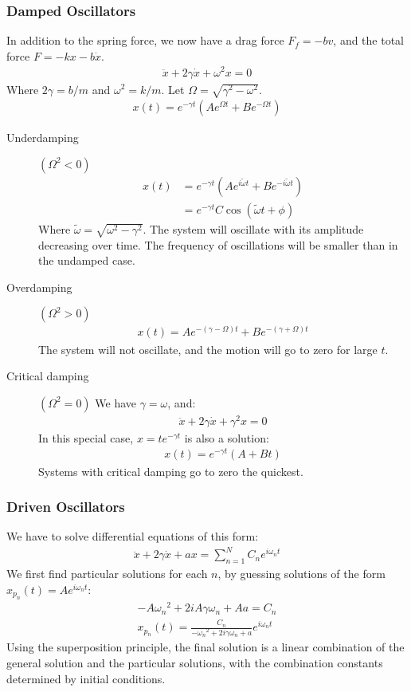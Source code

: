 \documentclass[a4paper]{article}
\begin{document}
\begin{multicols*}{2}
\subsubsection{Damped Oscillators}
In addition to the spring force, we now have a drag force $F_f=-bv$, and the
total force $F=-kx-b\dot{x}$.
\begin{align*}
  \ddot{x} + 2\gamma\dot{x}+\omega^2x=0
\end{align*}
Where $2\gamma=b/m$ and $\omega^2=k/m$. Let $\Omega = \sqrt{\gamma^2-\omega^2}$.
\begin{align*}
  x(t)=e^{-\gamma t}(Ae^{\Omega t}+Be^{-\Omega t})
\end{align*}
\begin{description}
\item [Underdamping] $(\Omega^2<0)$
  \begin{align*}
    x(t)&=e^{-\gamma t}(Ae^{i\tilde{\omega}t}+Be^{-i\tilde{\omega}t})\\
    &=e^{-\gamma t}C\cos(\tilde{\omega}t + \phi)
  \end{align*}
  Where $\tilde{\omega}=\sqrt{\omega^2-\gamma^2}$. The system will oscillate
  with its amplitude decreasing over time. The frequency of oscillations will be
  smaller than in the undamped case.
\item[Overdamping] $(\Omega^2>0)$
  \begin{align*}
    x(t)=Ae^{-(\gamma-\Omega)t}+Be^{-(\gamma+\Omega)t}
  \end{align*}
  The system will not oscillate, and the motion will go to zero for large $t$.
\item[Critical damping] $(\Omega^2=0)$
  We have $\gamma=\omega$, and:
  \begin{align*}
    \ddot{x}+2\gamma\dot{x}+\gamma^2x=0
  \end{align*}
  In this special case, $x=te^{-\gamma t}$ is also a solution:
  \begin{align*}
    x(t)=e^{-\gamma t}(A+Bt)
  \end{align*}
  Systems with critical damping go to zero the quickest.
\end{description}
\subsubsection{Driven Oscillators}
We have to solve differential equations of this form:
\begin{align*}
  \ddot{x}+2\gamma\dot{x}+ax=\sum_{n=1}^{N}{C_ne^{i\omega_nt}}
\end{align*}
We first find particular solutions for each $n$, by guessing solutions of the
form $x_{p_n}(t)=Ae^{i\omega_nt}$:
\begin{align*}
  -A{\omega_n}^2+2iA\gamma\omega_n+Aa=C_n \\
  x_{p_n}(t)=\frac{C_n}{-{\omega_n}^2+2i\gamma\omega_n+a}e^{i\omega_nt}
\end{align*}
Using the superposition principle, the final solution is a linear combination of
the general solution and the particular solutions, with the combination
constants determined by initial conditions.

\end{multicols*}
\end{document}
